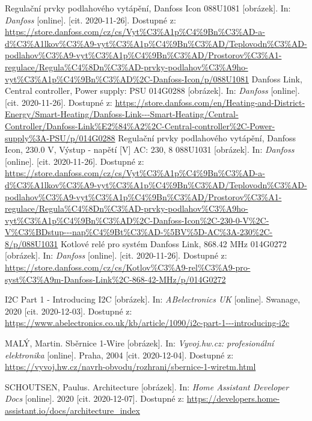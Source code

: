 \begin{thebibliography}{3}
Regulační prvky podlahového vytápění, Danfoss Icon 088U1081 [obrázek]. In: \textit{Danfoss} [online]. [cit. 2020-11-26]. Dostupné z: \url{https://store.danfoss.com/cz/cs/Vyt\%C3\%A1p\%C4\%9Bn\%C3\%AD-a-d\%C3\%A1lkov\%C3\%A9-vyt\%C3\%A1p\%C4\%9Bn\%C3\%AD/Teplovodn\%C3\%AD-podlahov\%C3\%A9-vyt\%C3\%A1p\%C4\%9Bn\%C3\%AD/Prostorov\%C3\%A1-regulace/Regula\%C4\%8Dn\%C3\%AD-prvky-podlahov\%C3\%A9ho-vyt\%C3\%A1p\%C4\%9Bn\%C3\%AD\%2C-Danfoss-Icon/p/088U1081}
Danfoss Link, Central controller, Power supply: PSU 014G0288 [obrázek]. In: \textit{Danfoss} [online]. [cit. 2020-11-26]. Dostupné z: \url{https://store.danfoss.com/en/Heating-and-District-Energy/Smart-Heating/Danfoss-Link---Smart-Heating/Central-Controller/Danfoss-Link\%E2\%84\%A2\%2C-Central-controller\%2C-Power-supply\%3A-PSU/p/014G0288}
Regulační prvky podlahového vytápění, Danfoss Icon, 230.0 V, Výstup - napětí [V] AC: 230, 8 088U1031 [obrázek]. In: \textit{Danfoss} [online]. [cit. 2020-11-26]. Dostupné z: \url{https://store.danfoss.com/cz/cs/Vyt\%C3\%A1p\%C4\%9Bn\%C3\%AD-a-d\%C3\%A1lkov\%C3\%A9-vyt\%C3\%A1p\%C4\%9Bn\%C3\%AD/Teplovodn\%C3\%AD-podlahov\%C3\%A9-vyt\%C3\%A1p\%C4\%9Bn\%C3\%AD/Prostorov\%C3\%A1-regulace/Regula\%C4\%8Dn\%C3\%AD-prvky-podlahov\%C3\%A9ho-vyt\%C3\%A1p\%C4\%9Bn\%C3\%AD\%2C-Danfoss-Icon\%2C-230-0-V\%2C-V\%C3\%BDstup---nap\%C4\%9Bt\%C3\%AD-\%5BV\%5D-AC\%3A-230\%2C-8/p/088U1031}
Kotlové relé pro systém Danfoss Link, 868.42 MHz 014G0272 [obrázek]. In: \textit{Danfoss} [online]. [cit. 2020-11-26]. Dostupné z: \url{https://store.danfoss.com/cz/cs/Kotlov\%C3\%A9-rel\%C3\%A9-pro-syst\%C3\%A9m-Danfoss-Link\%2C-868-42-MHz/p/014G0272}

I2C Part 1 - Introducing I2C [obrázek]. In: \textit{ABelectronics UK} [online]. Swanage, 2020 [cit. 2020-12-03]. Dostupné z: \url{https://www.abelectronics.co.uk/kb/article/1090/i2c-part-1---introducing-i2c}

MALÝ, Martin. Sběrnice 1-Wire [obrázek]. In: \textit{Vyvoj.hw.cz: profesionální elektronika} [online]. Praha, 2004 [cit. 2020-12-04]. Dostupné z: \url{https://vyvoj.hw.cz/navrh-obvodu/rozhrani/sbernice-1-wiretm.html}

SCHOUTSEN, Paulus. Architecture [obrázek]. In: \textit{Home Assistant Developer Docs} [online]. 2020 [cit. 2020-12-07]. Dostupné z: \url{https://developers.home-assistant.io/docs/architecture\_index}


\end{thebibliography}
